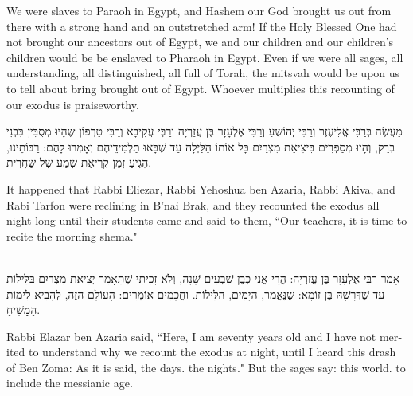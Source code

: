 \begin{english}
We were slaves to Paraoh in Egypt, and Hashem our God brought us out from there with a strong hand and an outstretched arm! If the Holy Blessed One had not brought our ancestors out of Egypt, we and our children and our children's children would be be enslaved to Pharaoh in Egypt. Even if we were all sages, all understanding, all distinguished, all full of Torah, the mitsvah would be upon us to tell about bring brought out of Egypt. Whoever multiplies this recounting of our exodus is praiseworthy.
\end{english}

\break

מַעֲשֶׂה בְּרַבִּי אֱלִיעֶזֶר וְרַבִּי יְהוֹשֻעַ וְרַבִּי אֶלְעָזָר בֶּן עֲזַרְיָה וְרַבְּי עֲקִיבָא וְרַבִּי טַרְפוֹן שֶהָיוּ מְסֻבִּין בִּבְנֵי בְרַק, וְהָיוּ מְסַפְּרִים בִּיצִיאַת מִצְרַיִם כָּל אוֹתוֹ הַלַּיְלָה עַד שֶׁבָּאוּ תַלְמִידֵיהֶם וְאָמְרוּ לָהֶם: רַבּוֹתֵינוּ, הִגִּיעַ זְמַן קְרִיאַת שְׁמַע שֶׁל שַׁחֲרִית.

\begin{english}
It happened that Rabbi Eliezar, Rabbi Yehoshua ben Azaria, Rabbi Akiva, and Rabi Tarfon were reclining in B'nai Brak, and they recounted the exodus all night long until their students came and said to them, ``Our teachers, it is time to recite the morning shema."
\end{english}

\ \\

אָמַר רַבִּי אֶלְעָזָר בֶּן עֲזַרְיָה: הֲרֵי אֲנִי כְבֶן שִׁבְעִים שָׁנָה, וְלֹא זָכִיתִי שֶׁתֵּאָמֵר יְצִיאַת מִצְרַיִם בַּלֵּילוֹת עַד שֶׁדְּרָשָׁהּ בֶּן זוֹמָא: שֶׁנֶּאֱמַר,
הַיָמִים,
הַלֵּילוֹת. וַחֲכָמִים אוֹמְרִים: 
הָעוֹלָם הַזֶּה, 
לְהָבִיא לִימוֹת הַמָשִׁיחַ.

\begin{english}
Rabbi Elazar ben Azaria said, ``Here, I am seventy years old and I have not merited to understand why we recount the exodus at night, until I heard this drash of Ben Zoma: As it is said,   the days.  the nights." But the sages say:  this world.  to include the messianic age.
\end{english}

